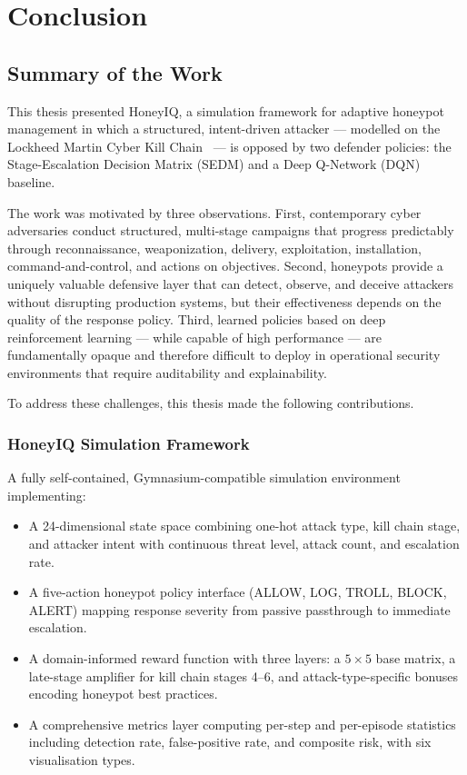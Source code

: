 \chapter{Conclusion}
\label{ch:conclusion}

\section{Summary of the Work}

This thesis presented HoneyIQ, a simulation framework for adaptive honeypot
management in which a structured, intent-driven attacker --- modelled on the
Lockheed Martin Cyber Kill Chain~\citep{hutchins2011intelligence} --- is
opposed by two defender policies: the Stage-Escalation Decision Matrix (SEDM)
and a Deep Q-Network (DQN) baseline.

The work was motivated by three observations.
First, contemporary cyber adversaries conduct structured, multi-stage campaigns
that progress predictably through reconnaissance, weaponization, delivery,
exploitation, installation, command-and-control, and actions on objectives.
Second, honeypots provide a uniquely valuable defensive layer that can detect,
observe, and deceive attackers without disrupting production systems, but their
effectiveness depends on the quality of the response policy.
Third, learned policies based on deep reinforcement learning --- while capable
of high performance --- are fundamentally opaque and therefore difficult to
deploy in operational security environments that require auditability and
explainability.

To address these challenges, this thesis made the following contributions.

\subsection{HoneyIQ Simulation Framework}

A fully self-contained, Gymnasium-compatible simulation environment implementing:
%
\begin{itemize}
  \item A 24-dimensional state space combining one-hot attack type, kill chain
        stage, and attacker intent with continuous threat level, attack count,
        and escalation rate.
  \item A five-action honeypot policy interface (ALLOW, LOG, TROLL, BLOCK,
        ALERT) mapping response severity from passive passthrough to immediate
        escalation.
  \item A domain-informed reward function with three layers: a $5 \times 5$
        base matrix, a late-stage amplifier for kill chain stages 4--6, and
        attack-type-specific bonuses encoding honeypot best practices.
  \item A comprehensive metrics layer computing per-step and per-episode
        statistics including detection rate, false-positive rate, and
        composite risk, with six visualisation types.
\end{itemize}

